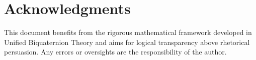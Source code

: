 \documentclass[12pt]{article}
\begin{document}
\section*{Acknowledgments}

This document benefits from the rigorous mathematical framework developed in Unified Biquaternion Theory and aims for logical transparency above rhetorical persuasion. Any errors or oversights are the responsibility of the author.
\end{document}
